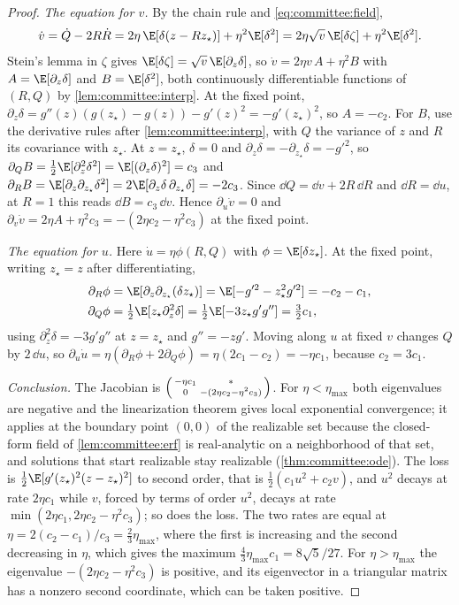 \begin{refsection}
\begin{proof}
\emph{The equation for $v$.} By the chain rule and \eqref{eq:committee:field},
\[
  \dot v=\dot Q-2R\dot R=2\eta\,\E[\delta(z-Rz_\star)]+\eta^2\E[\delta^2]=2\eta\sqrt v\,\E[\delta\zeta]+\eta^2\E[\delta^2].
\]
Stein's lemma in $\zeta$ gives $\E[\delta\zeta]=\sqrt v\,\E[\partial_z\delta]$, so $\dot v=2\eta v\,A+\eta^2B$ with $A=\E[\partial_z\delta]$ and $B=\E[\delta^2]$, both continuously differentiable functions of $(R,Q)$ by \cref{lem:committee:interp}. At the fixed point, $\partial_z\delta=g''(z)(g(z_\star)-g(z))-g'(z)^2=-g'(z_\star)^2$, so $A=-c_2$. For $B$, use the derivative rules after \cref{lem:committee:interp}, with $Q$ the variance of $z$ and $R$ its covariance with $z_\star$. At $z=z_\star$, $\delta=0$ and $\partial_z\delta=-\partial_{z_\star}\delta=-g'^2$, so $\partial_Q B=\frac12\E[\partial_z^2\delta^2]=\E[(\partial_z\delta)^2]=c_3$ and $\partial_RB=\E[\partial_z\partial_{z_\star}\delta^2]=2\E[\partial_z\delta\,\partial_{z_\star}\delta]=-2c_3$. Since $\dd Q=\dd v+2R\,\dd R$ and $\dd R=\dd u$, at $R=1$ this reads $\dd B=c_3\,\dd v$. Hence $\partial_u\dot v=0$ and $\partial_v\dot v=2\eta A+\eta^2c_3=-(2\eta c_2-\eta^2c_3)$ at the fixed point.

\emph{The equation for $u$.} Here $\dot u=\eta\phi(R,Q)$ with $\phi=\E[\delta z_\star]$. At the fixed point, writing $z_\star=z$ after differentiating,
\begin{align*}
  \partial_R\phi&=\E[\partial_z\partial_{z_\star}(\delta z_\star)]=\E[-g'^2-z_\star^2g'^2]=-c_2-c_1,\\
  \partial_Q\phi&=\tfrac12\E[z_\star\partial_z^2\delta]=\tfrac12\E[-3z_\star g'g'']=\tfrac32c_1,
\end{align*}
using $\partial_z^2\delta=-3g'g''$ at $z=z_\star$ and $g''=-zg'$. Moving along $u$ at fixed $v$ changes $Q$ by $2\,\dd u$, so $\partial_u\dot u=\eta(\partial_R\phi+2\partial_Q\phi)=\eta(2c_1-c_2)=-\eta c_1$, because $c_2=3c_1$.

\emph{Conclusion.} The Jacobian is $\begin{psmallmatrix}-\eta c_1&*\\0&-(2\eta c_2-\eta^2c_3)\end{psmallmatrix}$. For $\eta<\eta_{\max}$ both eigenvalues are negative and the linearization theorem gives local exponential convergence; it applies at the boundary point $(0,0)$ of the realizable set because the closed-form field of \cref{lem:committee:erf} is real-analytic on a neighborhood of that set, and solutions that start realizable stay realizable (\cref{thm:committee:ode}). The loss is $\frac12\E[g'(z_\star)^2(z-z_\star)^2]$ to second order, that is $\frac12(c_1u^2+c_2v)$, and $u^2$ decays at rate $2\eta c_1$ while $v$, forced by terms of order $u^2$, decays at rate $\min(2\eta c_1,2\eta c_2-\eta^2c_3)$; so does the loss. The two rates are equal at $\eta=2(c_2-c_1)/c_3=\frac23\eta_{\max}$, where the first is increasing and the second decreasing in $\eta$, which gives the maximum $\frac43\eta_{\max}c_1=8\sqrt5/27$. For $\eta>\eta_{\max}$ the eigenvalue $-(2\eta c_2-\eta^2c_3)$ is positive, and its eigenvector in a triangular matrix has a nonzero second coordinate, which can be taken positive.
\end{proof}


\end{refsection}
